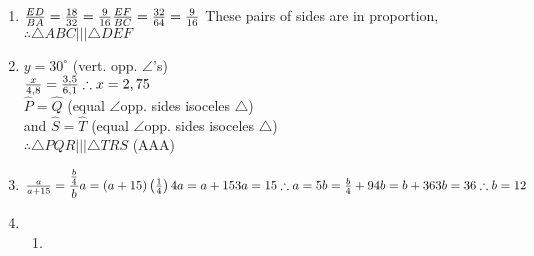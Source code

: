 \begin{eocsolutions}{}
{\begin{enumerate}[itemsep=5pt, label=\textbf{\arabic*}. ]
\begin{enumerate}[noitemsep, label=\textbf{(\alph*)} ]
\item $x=\sqrt{13^2+5^2} = \sqrt{139-25} =\sqrt{144} =12$ cm%

\item $x=\sqrt{2^2+7^2} = \sqrt{4+49} =\sqrt{53} =7,28$ cm%

\item $AC=\sqrt{25^2-7^2} = 576\\
\therefore AC=24\\
x^2 = 32^2+24^2\\
\therefore x=40$ mm%
	  \end{enumerate}
\item 
$\frac{ED}{BA} = \frac{18}{32} = \frac{9}{16}\\
\frac{EF}{BC} = \frac{32}{64} = \frac{9}{16}\\$
These pairs of sides are in proportion, $\therefore \triangle ABC ||| \triangle DEF$
\item 
$y=30^{\circ}$ (vert. opp. $\angle$'s)\\
$\frac{x}{4,8} = \frac{3,5}{6,1} \\
\therefore x = 2,75$\\
$\hat{P} = \hat{Q}$ (equal $\angle$\s opp. sides isoceles $\triangle$)\\
and $\hat{S} = \hat{T}$ (equal $\angle$\s opp. sides isoceles $\triangle$)\\
$\therefore \triangle PQR ||| \triangle TRS$ (AAA)
\item 
$\frac{a}{a+15} = \dfrac{\frac{b}{4}}{b}\\
a = (a+15) \left(\frac{1}{4}\right) \\
4a = a+15\\
3a=15\\
\therefore a=5\\
\\
b=\frac{b}{4} +9\\
4b=b+36\\
3b=36\\
\therefore b=12$
\item %
 \begin{enumerate}[noitemsep, label=\textbf{(\alph*)} ]
      \item 


\end{enumerate}
\end{enumerate}}
\end{eocsolutions}

